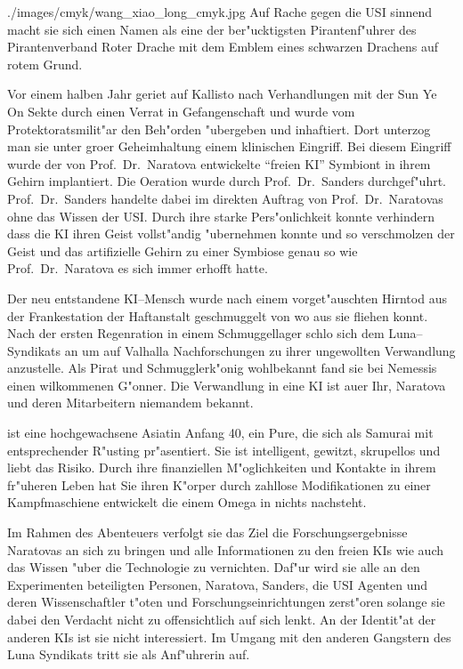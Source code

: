 \begin{sideimagebox}[r]{0.64}{./images/cmyk/wang_xiao_long_cmyk.jpg}{}
    Auf Rache gegen die USI sinnend macht sie sich einen Namen als eine der ber"ucktigsten Pirantenf"uhrer des Pirantenverband Roter Drache mit dem Emblem eines schwarzen Drachens auf rotem Grund.

    Vor einem halben Jahr geriet \xl{} auf Kallisto nach Verhandlungen mit der Sun Ye On Sekte durch einen Verrat in Gefangenschaft und wurde vom Protektoratsmilit"ar den Beh"orden "ubergeben und inhaftiert. Dort unterzog man sie unter gro\3er Geheimhaltung einem klinischen Eingriff. Bei diesem Eingriff wurde der von Prof.~Dr.~Naratova entwickelte ``freien KI'' Symbiont in ihrem Gehirn implantiert. Die Oeration wurde durch Prof.~Dr.~Sanders durchgef"uhrt. Prof.~Dr.~Sanders handelte dabei im direkten Auftrag von Prof.~Dr.~Naratovas ohne das Wissen der USI. Durch ihre starke Pers"onlichkeit konnte \xl{} verhindern dass die KI ihren Geist vollst"andig "ubernehmen konnte und so verschmolzen der Geist und das artifizielle Gehirn zu einer Symbiose genau so wie Prof.~Dr.~Naratova es sich immer erhofft hatte. 
\end{sideimagebox}

Der neu entstandene KI--Mensch wurde nach einem vorget"auschten Hirntod aus der Frankestation der Haftanstalt geschmuggelt von wo aus sie fliehen konnt. Nach der ersten Regenration in einem Schmuggellager schlo\3 sich \xl{} dem Luna--Syndikats an um auf Valhalla Nachforschungen zu ihrer ungewollten Verwandlung anzustelle. Als Pirat und Schmugglerk"onig wohlbekannt fand sie bei Nemessis einen wilkommenen G"onner. Die Verwandlung in eine KI ist au\3er Ihr, Naratova und deren Mitarbeitern niemandem bekannt.

\xl{} ist eine hochgewachsene Asiatin Anfang 40, ein Pure, die sich als Samurai mit entsprechender R"usting pr"asentiert. Sie ist intelligent, gewitzt, skrupellos und liebt das Risiko. Durch ihre finanziellen M"oglichkeiten und Kontakte in ihrem fr"uheren Leben hat Sie ihren K"orper durch zahllose Modifikationen zu einer Kampfmaschiene entwickelt die einem Omega in nichts nachsteht.

Im Rahmen des Abenteuers verfolgt sie das Ziel die Forschungsergebnisse Naratovas an sich zu bringen und alle Informationen zu den freien KIs wie auch das Wissen "uber die Technologie zu vernichten. Daf"ur wird sie alle an den Experimenten beteiligten Personen, Naratova, Sanders, die USI Agenten und deren Wissenschaftler t"oten und Forschungseinrichtungen zerst"oren solange sie dabei den Verdacht nicht zu offensichtlich auf sich lenkt. An der Identit"at der anderen KIs ist sie nicht interessiert. Im Umgang mit den anderen Gangstern des Luna Syndikats tritt sie als Anf"uhrerin auf.

